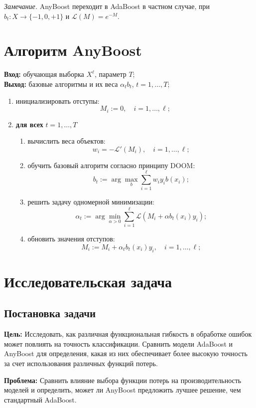\textit{Замечание.} AnyBoost переходит в AdaBoost в частном случае, при $b_t : X \to \{-1, 0, +1\}$ и $\mathcal{L}(M) = e^{-M}$.


\section*{Алгоритм AnyBoost}

\textbf{Вход:} обучающая выборка $X^\ell$, параметр $T$;\\
\textbf{Выход:} базовые алгоритмы и их веса $\alpha_t b_t$, $t = 1, \ldots, T$;

\begin{enumerate}
    \item инициализировать отступы: 
    \[
    M_i := 0, \quad i = 1, \ldots, \ell;
    \]
    \item \textbf{для всех} $t = 1, \ldots, T$
    \begin{enumerate}
        \item вычислить веса объектов:
        \[
        w_i = -\mathcal{L}'(M_i), \quad i = 1, \ldots, \ell;
        \]
        \item обучить базовый алгоритм согласно принципу DOOM:
        \[
        b_t := \arg \max_{b} \sum_{i=1}^{\ell} w_i y_i b(x_i);
        \]
        \item решить задачу одномерной минимизации:
        \[
        \alpha_t := \arg \min_{\alpha > 0} \sum_{i=1}^{\ell} \mathcal{L}(M_i + \alpha b_t(x_i) y_i);
        \]
        \item обновить значения отступов:
        \[
        M_i := M_i + \alpha_t b_t(x_i) y_i, \quad i = 1, \ldots, \ell;
        \]
    \end{enumerate}
\end{enumerate}

\section*{Исследовательская задача}
\subsection*{Постановка задачи}
\textbf{Цель:} Исследовать, как различная функциональная гибкость в обработке ошибок может повлиять на точность классификации. Сравнить модели AdaBoost и AnyBoost для определения, какая из них обеспечивает более высокую точность за счет использования различных функций потерь.

\textbf{Проблема:} Сравнить влияние выбора функции потерь на производительность моделей и определить, может ли AnyBoost предложить лучшее решение, чем стандартный AdaBoost.

